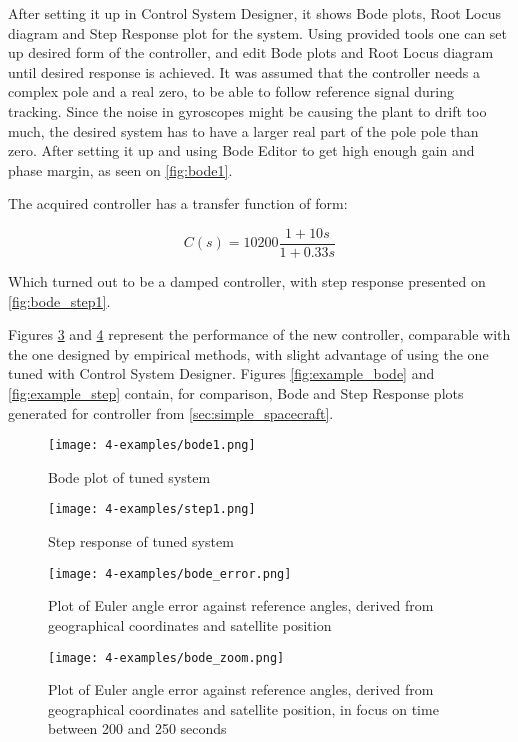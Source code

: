         After setting it up in Control System Designer, it shows Bode plots, Root Locus diagram and Step Response plot for the system. Using provided tools one can set up desired form of the controller, and edit Bode plots and Root Locus diagram until desired response is achieved. It was assumed that the controller needs a complex pole and a real zero, to be able to follow reference signal during tracking. Since the noise in gyroscopes might be causing the plant to drift too much, the desired system has to have a larger real part of the pole pole than zero. After setting it up and using Bode Editor to get high enough gain and phase margin, as seen on \autoref{fig:bode1}.

        The acquired controller has a transfer function of form:
        
        \begin{equation}
            C(s)=10200\frac{1+10s}{1+0.33s}
        \end{equation}

        Which turned out to be a damped controller, with step response presented on \autoref{fig:bode_step1}.
        
        Figures \ref{fig:bode_error} and \ref{fig:bode_zoom} represent the performance of the new controller, comparable with the one designed by empirical methods, with slight advantage of using the one tuned with Control System Designer. Figures \ref{fig:example_bode} and \ref{fig:example_step} contain, for comparison, Bode and Step Response plots generated for controller from \autoref{sec:simple_spacecraft}.

        \begin{figure}[H]
            \centering
            \texttt{[image: 4-examples/bode1.png]}
            \caption{Bode plot of tuned system}
            \label{fig:bode1}
        \end{figure}
        \vfill
        \begin{figure}[H]
            \centering
            \texttt{[image: 4-examples/step1.png]}
            \caption{Step response of tuned system}
            \label{fig:bode_step1}
        \end{figure}
                         
        \begin{figure}[H]
            \centering
            \texttt{[image: 4-examples/bode\_error.png]}
            \caption{Plot of Euler angle error against reference angles, derived from geographical coordinates and satellite position}
            \label{fig:bode_error}
        \end{figure}
        \vfill 
        \begin{figure}[H]
            \centering
            \texttt{[image: 4-examples/bode\_zoom.png]}
            \caption{Plot of Euler angle error against reference angles, derived from geographical coordinates and satellite position, in focus on time between 200 and 250 seconds}
            \label{fig:bode_zoom}
        \end{figure}

